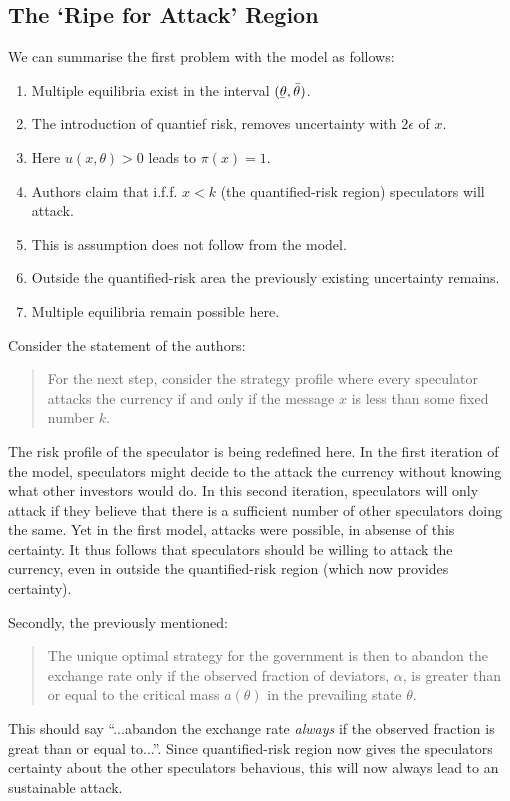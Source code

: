 \begin{refsection}
\subsection{The `Ripe for Attack' Region}
We can summarise the first problem with the model as follows:
\begin{enumerate}
	\item Multiple equilibria exist in the interval $(\underaccent{\bar}{\theta},\bar{\theta})$.
	\item The introduction of quantief risk, removes uncertainty with $2 \epsilon$ of $x$.
	\item Here $u(x,\theta) > 0$ leads to $\pi (x) = 1$.
	\item Authors claim that i.f.f. $x<k$ (the quantified-risk region) speculators will attack. 
	\item This is assumption does not follow from the model.
	\item Outside the quantified-risk area the previously existing uncertainty remains.
	\item Multiple equilibria remain possible here.
\end{enumerate}
Consider the statement of the authors:
\begin{quotation}
	For the next step,
	consider the strategy profile where every speculator attacks the currency if and only if
	the message $x$ is less than some fixed number $k$.
	\parencite[p.~592]{morris1998unique}
\end{quotation}
The risk profile of the speculator is being redefined here.
In the first iteration of the model,
speculators might decide to the attack the currency without knowing what other investors would do.
In this second iteration,
speculators will only attack if they believe that there is a sufficient number of other speculators doing the same.
Yet in the first model, attacks were possible, in absense of this certainty.
It thus follows that speculators should be willing to attack the currency,
even in outside the quantified-risk region (which now provides certainty).

Secondly, the previously mentioned:
\begin{quotation}
	The unique optimal strategy for the government is then to abandon the exchange rate
	only if the observed fraction of deviators, $\alpha$,
	is greater than or equal to the critical mass $a(\theta)$
	in the prevailing state $\theta$.
	\parencite[p.~591]{morris1998unique}
\end{quotation}
This should say ``...abandon the exchange rate \textit{always} if the observed fraction is great than or equal to...''.
Since quantified-risk region now gives the speculators certainty about the other speculators behavious,
this will now always lead to an sustainable attack.


\end{refsection}
